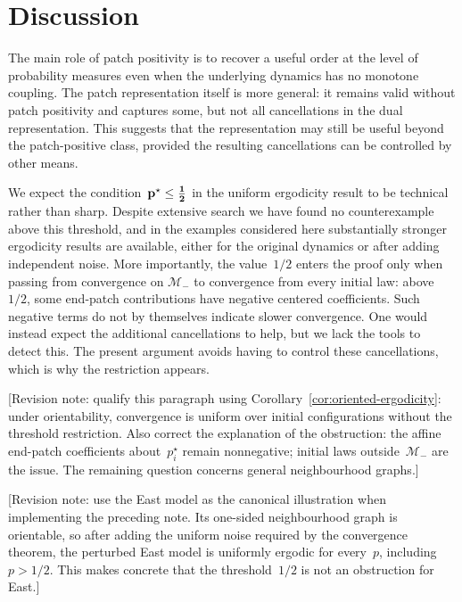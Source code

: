 \section{Discussion}
\label{sec:discussion}

The main role of patch positivity is to recover a useful order at the level of
probability measures even when the underlying dynamics has no monotone coupling.
The patch representation itself is more general: it remains valid without
patch positivity and captures some, but not all cancellations in the dual
representation. This suggests that the representation may still be useful
beyond the patch-positive class, provided the resulting cancellations can be
controlled by other means.

We expect the condition~$\mathbf{p}^\star\leq\boldsymbol{\tfrac12}$ in the uniform
ergodicity result to be technical rather than sharp. Despite extensive search
we have found no counterexample above this threshold, and in the examples
considered here substantially stronger ergodicity results are available, either
for the original dynamics or after adding independent noise. More importantly,
the value~$1/2$ enters the proof only when passing from convergence on
$\mathcal M_-$ to convergence from every initial law: above~$1/2$, some
end-patch contributions have negative centered coefficients. Such negative
terms do not by themselves indicate slower convergence. One would instead
expect the additional cancellations to help, but we lack the tools to detect
this. The present argument avoids having to control these cancellations, which
is why the restriction appears.

\textcolor{revisionpurple}{[Revision note: qualify this paragraph using
Corollary~\ref{cor:oriented-ergodicity}: under orientability, convergence is
uniform over initial configurations without the threshold restriction.
Also correct the explanation of the obstruction: the affine
end-patch coefficients about~$p_i^\star$ remain nonnegative; initial laws
outside~$\mathcal M_-$ are the issue. The remaining question concerns general
neighbourhood graphs.]}

\textcolor{revisionpurple}{[Revision note: use the East model as the canonical illustration when implementing the preceding note. Its one-sided neighbourhood graph is orientable, so after adding the uniform noise required by the convergence theorem, the perturbed East model is uniformly ergodic for every~$p$, including~$p>1/2$. This makes concrete that the threshold~$1/2$ is not an obstruction for East.]}
